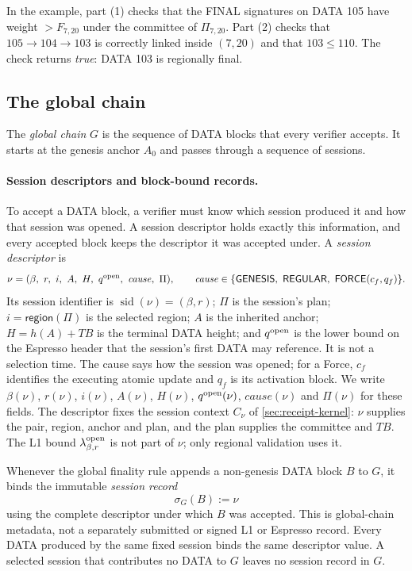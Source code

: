 \documentclass[11pt,a4paper]{article}
\newcommand{\TB}{\mathit{TB}}
\newcommand{\tagg}[1]{\ensuremath{\mathsf{#1}}}
\newcommand{\defterm}[1]{\textcolor{rrBlue}{\textit{#1}}}
\begin{document}
In the example, part (1) checks that the FINAL signatures on DATA 105
have weight $>F_{7,20}$ under the committee of $\Pi_{7,20}$. Part (2) checks that
$105\to104\to103$ is correctly linked inside $(7,20)$ and that
$103\le110$. The check returns \emph{true}: DATA 103 is regionally final.



\subsection{The global chain}
\label{sec:global-finality}
\label{sec:global-chain}
The \defterm{global chain} $G$ is the sequence of DATA blocks that every
verifier accepts. It starts at the genesis anchor $A_0$ and passes
through a sequence of sessions.

\paragraph{Session descriptors and block-bound records.}
To accept a DATA block, a verifier must know which session produced it
and how that session was opened. A session descriptor holds exactly this
information, and every accepted block keeps the descriptor it was
accepted under. A \defterm{session descriptor} is
\[
 \nu=(\beta,\ r,\ i,\ A,\ H,\ q^{\rm open},\ \mathit{cause},\ \Pi),\qquad
 \mathit{cause}\in\{\tagg{GENESIS},\ \tagg{REGULAR},\
 \tagg{FORCE}(c_f,q_f)\}.
\]
Its session identifier is $\operatorname{sid}(\nu)=(\beta,r)$; $\Pi$ is
the session's plan; $i=\tagg{region}(\Pi)$ is the selected region; $A$ is
the inherited anchor; $H=h(A)+\TB$ is the terminal DATA height; and
$q^{\rm open}$ is the lower bound on the Espresso header that the
session's first DATA may reference. It is not a selection time. The
cause says how the session was opened; for a Force, $c_f$ identifies the
executing atomic update and $q_f$ is its activation block.  We write
$\beta(\nu)$, $r(\nu)$, $i(\nu)$, $A(\nu)$, $H(\nu)$, $q^{\rm open}(\nu)$,
$\mathit{cause}(\nu)$ and $\Pi(\nu)$ for these fields.  The descriptor
fixes the session context $C_\nu$ of \cref{sec:receipt-kernel}: $\nu$
supplies the pair, region, anchor and plan, and the plan supplies the
committee and $\TB$.  The L1 bound $\lambda^{\rm open}_{\beta,r}$ is not
part of $\nu$; only regional validation uses it.

Whenever the global finality rule appends a non-genesis DATA block
$B$ to $G$, it binds the immutable \defterm{session record}
\[
 \sigma_G(B):=\nu
\]
using the complete descriptor under which $B$ was accepted. This is
global-chain metadata, not a separately submitted or signed L1 or
Espresso record.  Every DATA produced by the same fixed session binds
the same descriptor value.  A selected session that contributes no DATA
to $G$ leaves no session record in $G$.
\end{document}
